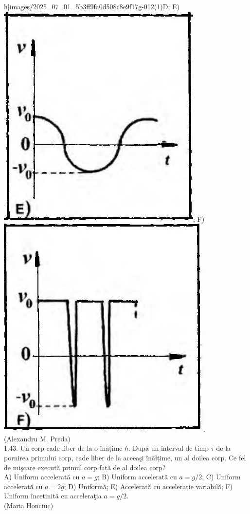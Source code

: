 h]{images/2025_07_01_5b3ff9fa0d508c8e9f17g-012(1)D}; E) \includegraphics[width=0.4\linewidth]{images/2025_07_01_5b3ff9fa0d508c8e9f17g-012(1)E}; F) \includegraphics[width=0.4\linewidth]{images/2025_07_01_5b3ff9fa0d508c8e9f17g-012(1)F}.\\ (Alexandru M. Preda)\\

1.43. Un corp cade liber de la o înățime $h$. După un interval de timp $\tau$ de la pornirea primului corp, cade liber de la aceeaşi înălțime, un al doilea corp. Ce fel de mişcare execută primul corp față de al doilea corp?\\ A) Uniform accelerată cu $a=g$; B) Uniform acceleratã cu $a=g / 2$; C) Uniform accelerată cu $a=2 g$; D) Uniformă; E) Accelerată cu accelerație variabilă; F) Uniform încetinită cu acceleraţia $a=g / 2$.\\ (Maria Honciuc)\\

